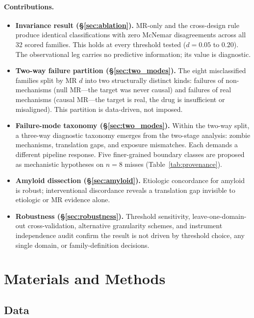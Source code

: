 \documentclass[11pt]{article}
\begin{document}
\paragraph{Contributions.}
\begin{itemize}
\item \textbf{Invariance result (\S\ref{sec:ablation}).} MR-only and the cross-design rule produce identical classifications with zero McNemar disagreements across all 32 scored families. This holds at every threshold tested ($d = 0.05$ to $0.20$). The observational leg carries no predictive information; its value is diagnostic.
\item \textbf{Two-way failure partition (\S\ref{sec:two_modes}).} The eight misclassified families split by MR $d$ into two structurally distinct kinds: failures of non-mechanisms (null MR---the target was never causal) and failures of real mechanisms (causal MR---the target is real, the drug is insufficient or misaligned). This partition is data-driven, not imposed.
\item \textbf{Failure-mode taxonomy (\S\ref{sec:two_modes}).} Within the two-way split, a three-way diagnostic taxonomy emerges from the two-stage analysis: zombie mechanisms, translation gaps, and exposure mismatches. Each demands a different pipeline response. Five finer-grained boundary classes are proposed as mechanistic hypotheses on $n = 8$ misses (Table~\ref{tab:provenance}).
\item \textbf{Amyloid dissection (\S\ref{sec:amyloid}).} Etiologic concordance for amyloid is robust; interventional discordance reveals a translation gap invisible to etiologic or MR evidence alone.
\item \textbf{Robustness (\S\ref{sec:robustness}).} Threshold sensitivity, leave-one-domain-out cross-validation, alternative granularity schemes, and instrument independence audit confirm the result is not driven by threshold choice, any single domain, or family-definition decisions.
\end{itemize}

\section{Materials and Methods}

\subsection{Data}
\end{document}
